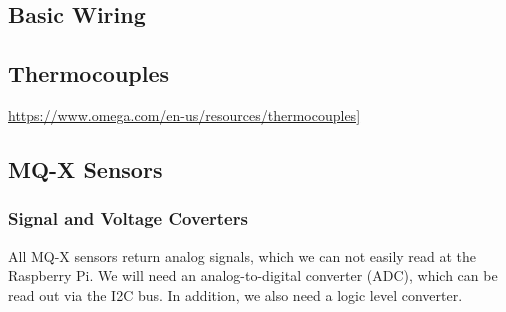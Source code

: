 \documentclass{article}\usepackage[]{graphicx}\usepackage[]{color}
\begin{document}
\subsection{Basic Wiring}




\subsection{Thermocouples}

\href{Thermocouples Sensors}{https://www.omega.com/en-us/resources/thermocouples]}


\subsection{MQ-X Sensors}

\subsubsection{Signal and Voltage Coverters}

All MQ-X sensors return analog signals, which we can not easily read at the Raspberry Pi. We will need an analog-to-digital converter (ADC), which can be read out via the I2C bus. In addition, we also need a logic level converter.
\end{document}
